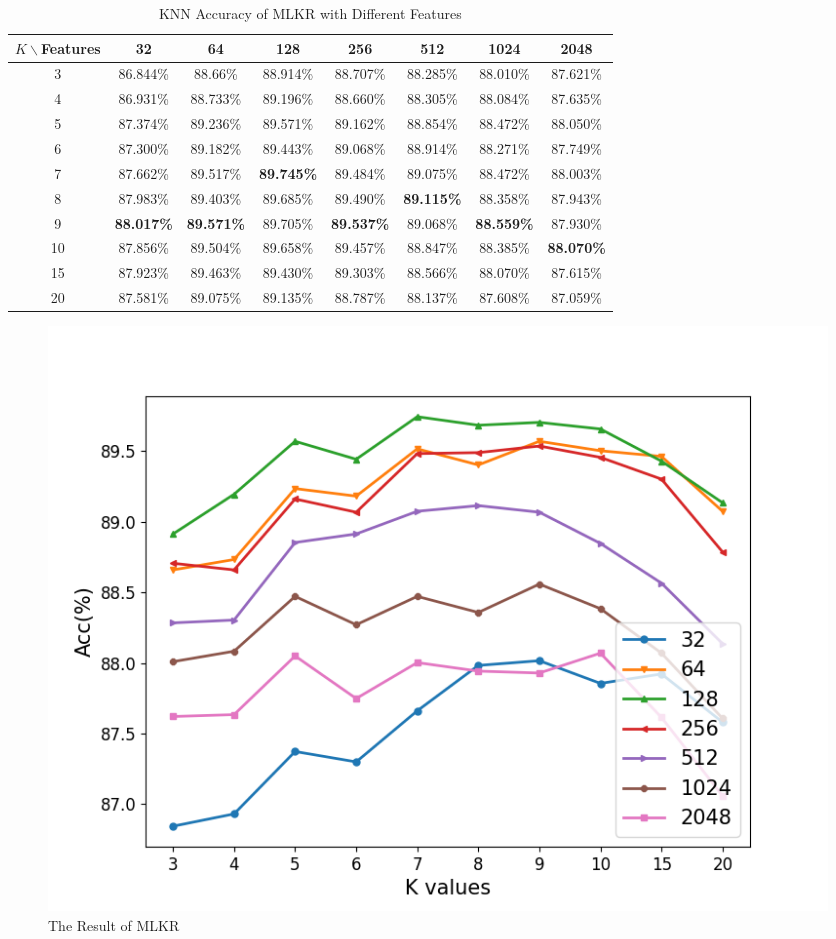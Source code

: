 \begin{table}[htbp]
    \centering
    \caption{KNN Accuracy of MLKR with Different Features}
    \begin{tabular}{@{}cccccccc@{}}
    \toprule
    $K \backslash $Features & 32 & 64 & 128 & 256 & 512 & 1024 & 2048 \\ \midrule
    3 & 86.844\% & 88.66\% & 88.914\% & 88.707\% & 88.285\% & 88.010\% & 87.621\% \\
    4 & 86.931\% & 88.733\% & 89.196\% & 88.660\% & 88.305\% & 88.084\% & 87.635\% \\
    5 & 87.374\% & 89.236\% & 89.571\% & 89.162\% & 88.854\% & 88.472\% & 88.050\% \\
    6 & 87.300\% & 89.182\% & 89.443\% & 89.068\% & 88.914\% & 88.271\% & 87.749\% \\
    7 & 87.662\% & 89.517\% & \textbf{89.745\%} & 89.484\% & 89.075\% & 88.472\% & 88.003\% \\
    8 & 87.983\% & 89.403\% & 89.685\% & 89.490\% & \textbf{89.115\%} & 88.358\% & 87.943\% \\
    9 & \textbf{88.017\%} & \textbf{89.571\%} & 89.705\% & \textbf{89.537\%} & 89.068\% & \textbf{88.559\%} & 87.930\% \\
    10 & 87.856\% & 89.504\% & 89.658\% & 89.457\% & 88.847\% & 88.385\% & \textbf{88.070\%} \\
    15 & 87.923\% & 89.463\% & 89.430\% & 89.303\% & 88.566\% & 88.070\% & 87.615\% \\
    20 & 87.581\% & 89.075\% & 89.135\% & 88.787\% & 88.137\% & 87.608\% & 87.059\% \\
    \bottomrule
    \end{tabular}
    \label{tab:mlkr}
\end{table}

    \begin{figure}[htbp]
        \centering
        \includegraphics[width=0.6\linewidth]{img/MLKR_res.png}
        \caption{The Result of MLKR}
        \label{fig:mlkr_res}
    \end{figure}


